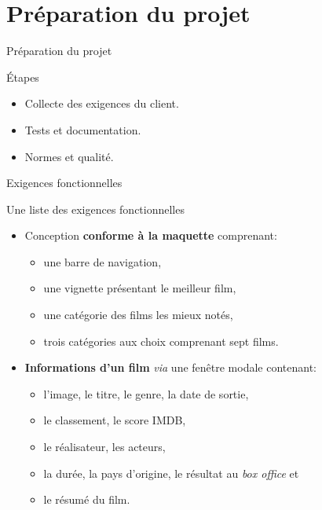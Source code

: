 \section{Préparation du projet}

\begin{frame}{Préparation du projet}
  \begin{block}{Étapes}
    \begin{itemize}
    \item Collecte des exigences du client.
    \item Tests et documentation.
    \item Normes et qualité.
    \end{itemize}
  \end{block}
\end{frame}

\begin{frame}{Exigences fonctionnelles}

  \begin{block}{Une liste des exigences fonctionnelles}
    \begin{itemize}
    \item Conception \textbf{conforme à la maquette} comprenant:
      \begin{itemize}
      \item une barre de navigation,
      \item une vignette présentant le meilleur film,
      \item une catégorie des films les mieux notés,
      \item trois catégories aux choix comprenant sept films.        
      \end{itemize}
    \item \textbf{Informations d'un film} \textit{via} une fenêtre
      modale contenant:
      \begin{itemize}
      \item l'image, le titre, le genre, la date de sortie,
      \item le classement, le score IMDB,
      \item le réalisateur, les acteurs,
      \item la durée, la pays d'origine, le résultat au \textit{box
        office} et
      \item le résumé du film.
      \end{itemize}
    \end{itemize}
  \end{block}
\end{frame}

